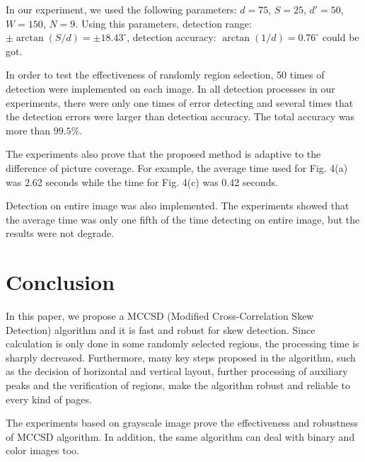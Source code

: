 \documentclass[conference]{IEEEtran}
\begin{document}
	In our experiment, we used the following parameters: $d = 75$, $S = 25$, $d' = 50$, $W = 150$, $N = 9$. Using this parameters, detection range: $\pm \arctan(S / d) = \pm 18.43^\circ$, detection accuracy: $\arctan(1 / d) = 0.76^\circ$ could be got.
	
	In order to test the effectiveness of randomly region selection, 50 times of detection were implemented on each image. In all detection processes in our experiments, there were only one times of error detecting and several times that the detection errors were larger than detection accuracy. The total accuracy was more than $99.5\%$.
	
	The experiments also prove that the proposed method is adaptive to the difference of picture coverage. For example, the average time used for Fig. 4(a) was 2.62 seconds while the time for Fig. 4(c) was 0.42 seconds.
	
	Detection on entire image was also implemented. The experiments showed that the average time was only one fifth of the time detecting on entire image, but the results were not degrade.
	
	\section{Conclusion}
	In this paper, we propose a MCCSD (Modified Cross-Correlation Skew Detection) algorithm and it is fast and robust for skew detection. Since calculation is only done in some randomly selected regions, the processing time is sharply decreased. Furthermore, many key steps proposed in the algorithm, such as the decision of horizontal and vertical layout, further processing of auxiliary peaks and the verification of regions, make the algorithm robust and reliable to every kind of pages.
	
	The experiments based on grayscale image prove the effectiveness and robustness of MCCSD algorithm. In addition, the same algorithm can deal with binary and color images too.
	
\end{document}
